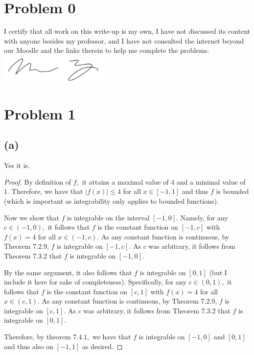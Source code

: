 \documentclass[10pt]{article}
\begin{document}
\section*{Problem 0}

I certify that all work on this write-up is my own, I have not discussed its content with anyone besides my professor, and I have not consulted the internet beyond our Moodle and the links therein to help me complete the problems.\\

\noindent
\includegraphics[width=0.4\textwidth]{signature.jpg}

\newpage
\section*{Problem 1}

\subsection*{(a)}
Yes it is.

\begin{proof}
    By definition of $f,$ it attains a maximal value of $4$ and a minimal value of $1$.
    Therefore, we have that $|f(x)|\le 4$ for all $x\in[-1,1]$ and thus $f$ is bounded (which is important as integrability only applies to bounded functions).

    Now we show that $f$ is integrable on the interval $[-1,0].$ Namely, for any $c\in (-1,0),$ it follows that $f$ is the constant function on $[-1,c]$ with $f(x)=4$ for all $x\in(-1,c)$. As any constant function is continuous, by Theorem 7.2.9, $f$ is integrable on $[-1,c]$. As $c$ was arbitrary, it follows from Theorem 7.3.2 that $f$ is integrable on $[-1,0].$

    By the same argument, it also follows that $f$ is integrable on $[0,1]$ (but I include it here for sake of completeness). Specifically, for any $c\in (0,1),$ it follows that $f$ is the constant function on $[c,1]$ with $f(x)=4$ for all $x\in(c,1)$. As any constant function is continuous, by Theorem 7.2.9, $f$ is integrable on $[c,1]$. As $c$ was arbitrary, it follows from Theorem 7.3.2 that $f$ is integrable on $[0,1].$
    
    Therefore, by theorem $7.4.1,$ we have that $f$ is integrable on $[-1, 0]$ and $[0,1]$ and thus also on $[-1,1]$ as desired.
\end{proof}
\end{document}
